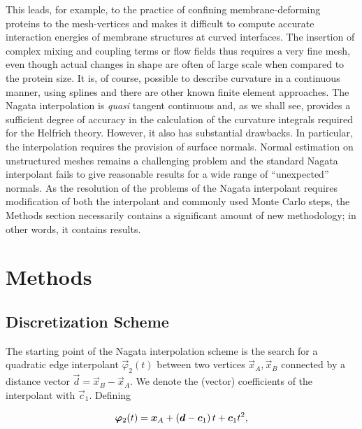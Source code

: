 \documentclass[twocolumn]{biophys-new}
\begin{document}
This leads, for example,
to the practice of confining membrane-deforming proteins to the mesh-vertices\cite{dtmc,C9SM01762C} and makes it difficult to compute accurate interaction energies of membrane structures at curved interfaces. The insertion of complex mixing and coupling terms or flow fields thus requires a very fine mesh, even though actual changes in shape are often of large scale when compared to the protein size.
It is, of course, possible to describe curvature in a continuous manner, using splines\cite{cjmsolver} and there are other known finite element approaches.\cite{barrett2017finite}
The Nagata interpolation\cite{NAGATA2005327} is \textit{quasi} tangent continuous and, as we shall see, provides a sufficient degree of accuracy in the calculation of the curvature integrals required for the Helfrich theory. However, it also has substantial drawbacks. In particular, the interpolation requires the provision of surface normals. Normal estimation on unstructured meshes remains a challenging problem and the standard Nagata interpolant fails to give reasonable results for a wide range of ``unexpected'' normals.\cite{NETO2013639} As the resolution of the problems of the Nagata interpolant requires modification of both the interpolant and commonly used Monte Carlo steps, the Methods section necessarily contains a significant amount of new methodology; in other words, it contains results.

\section*{Methods}

\subsection*{Discretization Scheme}

The starting point of the Nagata interpolation scheme\cite{NAGATA2005327} is the search for a quadratic edge interpolant $  \vec{\varphi}_2(t)$ between two vertices $\vec{x}_A, \vec{x}_B$ connected by a distance vector $\vec{d} = \vec{x}_B - \vec{x}_A$. We denote the (vector) coefficients of the interpolant with $\vec{c}_1$. Defining

\begin{equation}
  \bm{\varphi}_2(t)
  =
  \bm{x}_A + \left( \bm{d} - \bm{c}_1 \right) t + \bm{c}_1 t^2, 
\end{equation}
\end{document}
